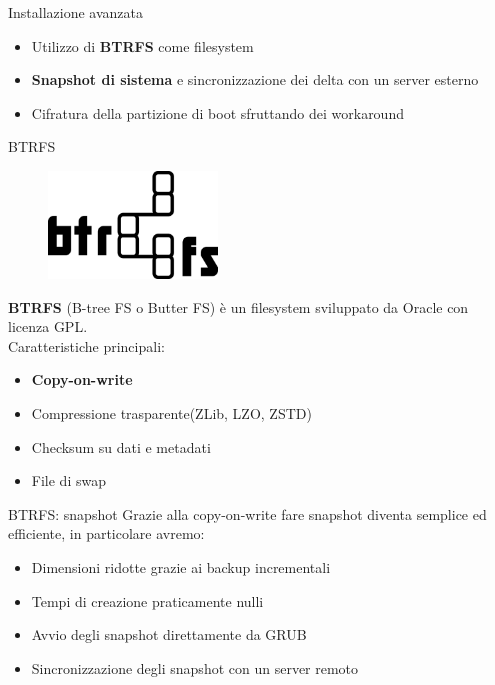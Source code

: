 \begin{frame}{Installazione avanzata}
    \begin{itemize}
        \item Utilizzo di \textbf{BTRFS} come filesystem
        \item \textbf{Snapshot di sistema} e sincronizzazione dei delta con un server esterno
        \item Cifratura della partizione di boot sfruttando dei workaround
    \end{itemize}
\end{frame}
\begin{frame}{BTRFS}
    \begin{figure}[h]
        \includegraphics[width=0.4\textwidth]{images/btrfs.png}
    \end{figure}
    \textbf{BTRFS} (B-tree FS o Butter FS) è un filesystem sviluppato da Oracle con licenza GPL.\\
    \vspace{10pt}
    Caratteristiche principali:
    \begin{itemize}
        \item \textbf{Copy-on-write}
        \item Compressione trasparente(ZLib, LZO, ZSTD)
        \item Checksum su dati e metadati
        \item File di swap
    \end{itemize}
\end{frame}
\begin{frame}{BTRFS: snapshot}
    Grazie alla copy-on-write fare snapshot diventa semplice ed efficiente, in particolare avremo:
    \begin{itemize}
        \item Dimensioni ridotte grazie ai backup incrementali
        \item Tempi di creazione praticamente nulli
        \item Avvio degli snapshot direttamente da GRUB
        \item Sincronizzazione degli snapshot con un server remoto
    \end{itemize}
\end{frame}

